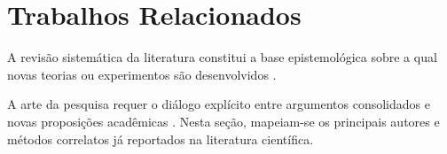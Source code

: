 \section{Trabalhos Relacionados}
\label{sec:relacionados}

A revisão sistemática da literatura constitui a base epistemológica sobre a qual novas teorias ou experimentos são desenvolvidos \cite{booth2021systematic, boland2017systematic}. 

A arte da pesquisa requer o diálogo explícito entre argumentos consolidados e novas proposições acadêmicas \cite{booth2024craft, graff2024theysay}. Nesta seção, mapeiam-se os principais autores e métodos correlatos já reportados na literatura científica.
